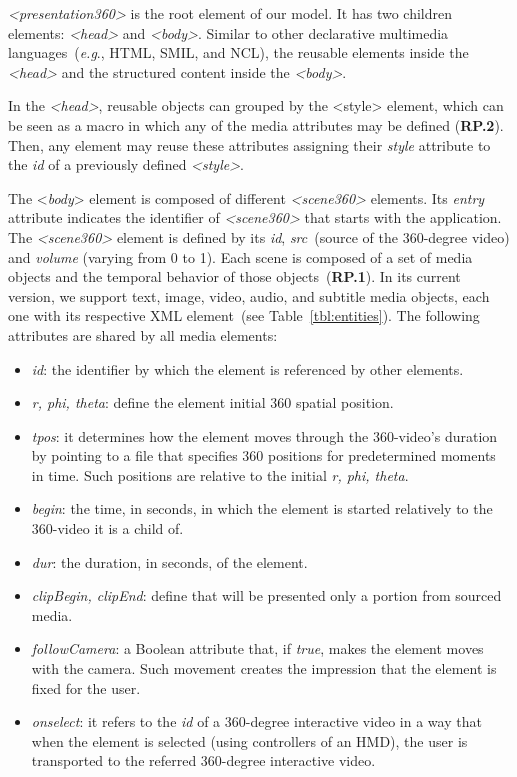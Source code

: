 \emph{<presentation360>} is the root element of our model.
It has two children elements: \emph{<head>} and \emph{<body>}.
Similar to other declarative multimedia languages~(\emph{e.g}., HTML, SMIL,
and NCL), the reusable elements inside the \emph{<head>} and the structured
content inside the \emph{<body>}.

In the \emph{<head>},  reusable objects can grouped by the <style> element,
which can be seen as a macro in which any of the media attributes may be
defined (\textbf{RP.2}).
Then, any element may reuse these attributes assigning their \emph{style}
attribute to the \emph{id} of a previously defined \emph{<style>}.

The <\emph{body}> element is composed of different \emph{\emph{<scene360>}}
elements.
Its \emph{entry} attribute indicates the identifier of \textit{<scene360>} that
starts with the application.
The \emph{<scene360>} element is defined by its \emph{id}, \emph{src}~(source
of the 360-degree video) and \emph{volume} (varying from 0 to 1). 
Each scene is composed of a set of media objects and the temporal behavior of
those objects~(\textbf{RP.1}).
In its current version, we support text, image, video, audio, and
subtitle media objects, each one with its respective XML element~(see
Table~\ref{tbl:entities}).
The following attributes are shared by all media elements:

\begin{itemize}
  \item \emph{id}: the identifier by which the element is referenced by other elements.
  \item \emph{r, phi, theta}: define the element initial 360 spatial position.
  \item \emph{tpos}: it determines how the element moves through the 360-video's duration by pointing to a file that specifies 360 positions for predetermined moments in time. Such positions are relative to the initial \emph{r, phi, theta}.    
  \item \emph{begin}: the time, in seconds, in which the element is started relatively to the 360-video it is a child of.
  \item \emph{dur}: the duration, in seconds, of the element.
  \item \emph{clipBegin, clipEnd}: define that will be presented only a portion from sourced media.
  \item \emph{followCamera}: a Boolean attribute that, if \emph{true}, makes the element moves with the camera. Such movement creates the impression that the element is fixed for the user.
  \item \emph{onselect}: it refers to the \emph{id} of a 360-degree interactive video in a way that when the element is selected (using controllers of an HMD), the user is transported to the referred 360-degree interactive video.
\end{itemize}

